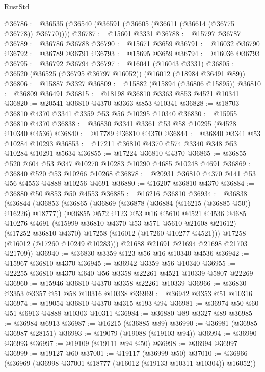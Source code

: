 \begin{lexlean}{RustStd}
\begin{coremodule}
@36786 := @36535 (@36540 (@36591 (@36605 (@36611 (@36614 (@36775 @36778)) @36770))))
@36787 := @15601 @3331
@36788 := @15797 @36787
@36789 := @36786 @36788
@36790 := @15671 @3659
@36791 := @16032 @36790
@36792 := @36789 @36791
@36793 := @15695 @3659
@36794 := @16036 @36793
@36795 := @36792 @36794
@36797 := @16041 (@16043 @3331)
@36805 := @36520 (@36525 (@36795 @36797 @16052)) (@16012 (@18984 @36491 @89))
@36806 := @15887 @3327
@36809 := @15882 (@15894 (@36806 @15895))
@36810 := @36809 @36491
@36815 := @18198 @36810 @3363 @853 @4521 @10341
@36820 := @20541 @36810 @4370 @3363 @853 @10341
@36828 := @18703 @36810 @4370 @3341 @3359 @53 @56 @10295 @10340
@36830 := @15955 @36810 @4370
@36838 := @36830 @3341 @3361 @53 @58 @10295 (@4528 @10340 @4536)
@36840 := @17789 @36810 @4370
@36844 := @36840 @3341 @53 @10284 @10293
@36853 := @17211 @36810 @4370 @574 @3340 @348 @53 @10284 @10291 @5634
@36855 := @17224 @36810 @4370
@36865 := @36855 @520 @604 @53 @347 @10270 @10283 @10290 @4685 @10248 @4691
@36869 := @36840 @520 @53 @10266 @10268
@36878 := @20931 @36810 @4370 @141 @53 @56 @4553 @4888 @10256 @4691
@36880 := @16207 @36810 @4370
@36884 := @36880 @50 @853 @50 @4553
@36885 := @16216 @36810
@36934 := @36838
    (@36844
      (@36853
        (@36865
          (@36869 (@36878 (@36884 (@16215 (@36885 @50)) @16226) @18777))
          (@36855
            @572
            @123
            @53
            @16
            @5610
            @4521
            @4536
            @4685
            @10276
            @4691
            (@15999 @36810 @4370 @53 @571 @5610 @21608 @21612)
            (@17252 @36810 @4370)
            @17258
            (@16012 (@17260 @10277 @4521)))
          @17258
          (@16012 (@17260 @10249 @10283)))
        @21688
        @21691
        @21694
        @21698
        @21703
        @21709))
@36940 := @36830 @3359 @123 @56 @16 @10340 @4536
@36942 := @15967 @36810 @4370
@36945 := @36942 @3359 @56 @10340
@36955 := @22255 @36810 @4370 @640 @56 @3358 @22261 @4521 @10339 @5807 @22269
@36960 := @15946 @36810 @4370 @3358 @22261 @10339
@36966 := @36830 @3353 @3357 @51 @58 @10316 @10338
@36969 := @36942 @3353 @51 @10316
@36974 := @19054 @36810 @4370 @4315 @193 @94
@36981 := @36974 @50 @60 @51 @6913 @4888 @10303 @10311
@36984 := @36880 @89 @3327 @89
@36985 := @36984 @6913
@36987 := @16215 (@36885 @89)
@36990 := @36981 (@36985 @36987 @28151)
@36993 := @19079 (@19088 (@19103 @94))
@36994 := @36990 @36993
@36997 := @19109 (@19111 @94 @50)
@36998 := @36994 @36997
@36999 := @19127 @60
@37001 := @19117 (@36999 @50)
@37010 := @36966 (@36969 (@36998 @37001 @18777 (@16012 (@19133 @10311 @10304)) @16052))

\end{coremodule}
\end{lexlean}
